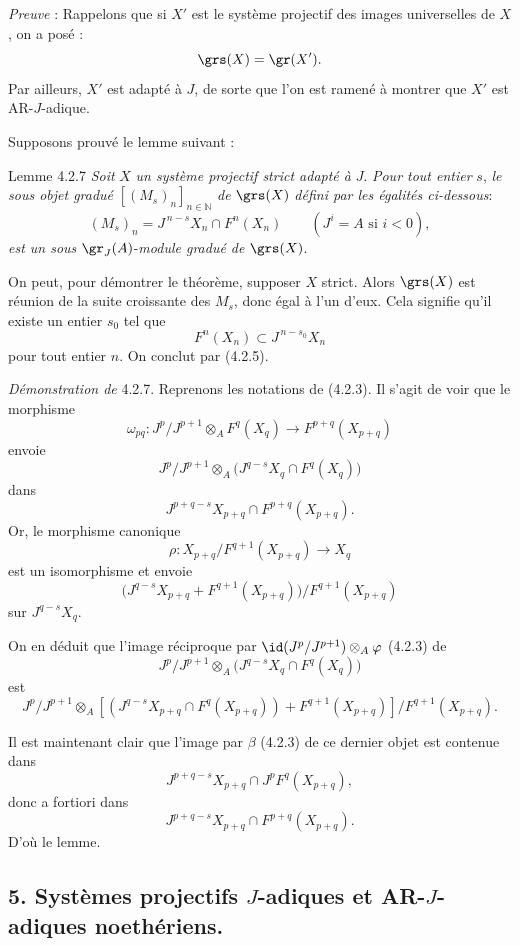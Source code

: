 \emph{Preuve} : Rappelons que si \(X'\) est le système projectif des images universelles de \(X\), on a posé :
\[
\grs(X)=\gr(X').
\]
Par ailleurs, \(X'\) est adapté à \(J\), de sorte que l'on est ramené à montrer que \(X'\) est AR-\(J\)-adique.

Supposons prouvé le lemme suivant :

\begin{statement}{Lemme 4.2.7}
\emph{Soit} \(X\) \emph{un système projectif strict adapté à} \(J\). \emph{Pour tout entier} \(s\), \emph{le sous objet gradué} \([(M_s)_n]_{n\in\mathbb{N}}\) \emph{de} \(\grs(X)\) \emph{défini par les égalités ci-dessous}:
\[
(M_s)_n=J^{\,n-s}X_n\cap F^n(X_n)\qquad(J^i=A\text{ si }i<0),
\]
\emph{est un
sous} \(\gr_J(A)\)-\emph{module gradué de} \(\grs(X)\).
\end{statement}

On peut, pour démontrer le théorème, supposer \(X\) strict. Alors \(\grs(X)\) est réunion de la suite croissante des \(M_s\), donc égal à l'un d'eux. Cela signifie qu'il existe un entier \(s_0\) tel que
\[
F^n(X_n)\subset J^{\,n-s_0}X_n
\]
pour tout entier \(n\). On conclut par (4.2.5).

\emph{Démonstration de} 4.2.7. Reprenons les notations de (4.2.3). Il s'agit de voir que le morphisme
\[
\omega_{pq}:J^p/J^{p+1}\otimes_A F^q(X_q)\longrightarrow F^{p+q}(X_{p+q})
\]
envoie
\[
J^p/J^{p+1}\otimes_A
\bigl(J^{q-s}X_q\cap F^q(X_q)\bigr)
\]
dans
\[
J^{p+q-s}X_{p+q}\cap F^{p+q}(X_{p+q}).
\]
Or, le morphisme canonique
\[
\rho:X_{p+q}/F^{q+1}(X_{p+q})\longrightarrow X_q
\]
est un isomorphisme et envoie
\[
\bigl(J^{q-s}X_{p+q}+F^{q+1}(X_{p+q})\bigr)/F^{q+1}(X_{p+q})
\]
sur \(J^{q-s}X_q\).

On en déduit que l'image réciproque par
\(\id(J^p/J^{p+1})\otimes_A\varphi\) (4.2.3) de
\[
J^p/J^{p+1}\otimes_A
\bigl(J^{q-s}X_q\cap F^q(X_q)\bigr)
\]
est
\[
J^p/J^{p+1}\otimes_A
[(J^{q-s}X_{p+q}\cap F^q(X_{p+q}))+F^{q+1}(X_{p+q})]/F^{q+1}(X_{p+q}).
\]

Il est maintenant clair que l'image par \(\beta\) (4.2.3) de ce dernier objet est contenue dans
\[
J^{p+q-s}X_{p+q}\cap J^pF^q(X_{p+q}),
\]
donc a fortiori dans
\[
J^{p+q-s}X_{p+q}\cap F^{p+q}(X_{p+q}).
\]
D'où le lemme.

\subsection*{5. Systèmes projectifs \(J\)-adiques et AR-\(J\)-adiques noethériens.}

